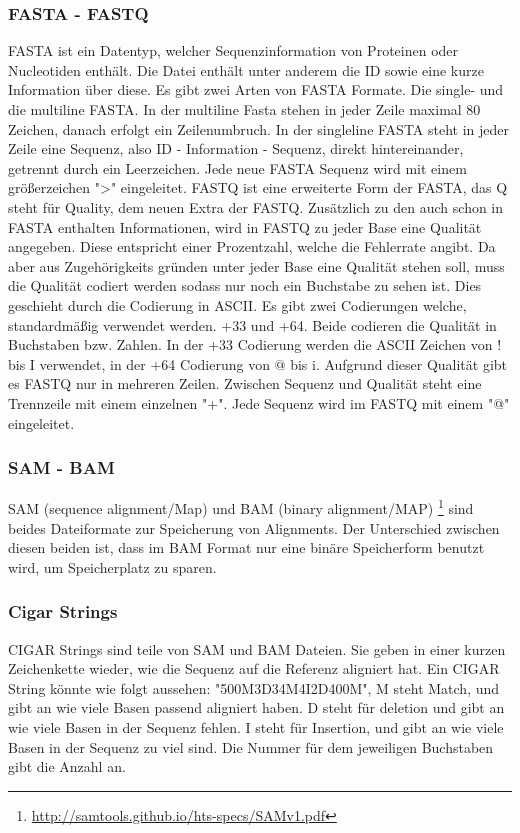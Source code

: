 \documentclass{scrartcl}
\begin{document}
\subsubsection{FASTA - FASTQ}
\label{sec-4-1-1}
FASTA ist ein Datentyp, welcher Sequenzinformation von Proteinen oder Nucleotiden enthält. Die Datei enthält unter anderem
die ID sowie eine kurze Information über diese. Es gibt zwei Arten von FASTA Formate. Die single- und die multiline FASTA.
In der multiline Fasta stehen in jeder Zeile maximal 80 Zeichen, danach erfolgt ein Zeilenumbruch. In der singleline FASTA
steht in jeder Zeile eine Sequenz, also ID - Information - Sequenz, direkt hintereinander, getrennt durch ein Leerzeichen.
Jede neue FASTA Sequenz wird mit einem größerzeichen ">" eingeleitet. 
FASTQ ist eine erweiterte Form der FASTA, das Q steht für Quality, dem neuen Extra der FASTQ. Zusätzlich zu den auch schon in FASTA
enthalten Informationen, wird in FASTQ zu jeder Base eine Qualität angegeben. Diese entspricht einer Prozentzahl, welche die Fehlerrate angibt.
Da aber aus Zugehörigkeits gründen unter jeder Base eine Qualität stehen soll, muss die Qualität codiert werden sodass nur noch ein Buchstabe zu sehen ist.
Dies geschieht durch die Codierung in ASCII. Es gibt zwei Codierungen welche, standardmäßig verwendet werden. +33 und +64. Beide codieren die Qualität in Buchstaben bzw. 
Zahlen. In der +33 Codierung werden die ASCII Zeichen von ! bis I verwendet, in der +64 Codierung von @ bis i. Aufgrund dieser Qualität gibt es FASTQ nur in mehreren Zeilen.
Zwischen Sequenz und Qualität steht eine Trennzeile mit einem einzelnen "+". Jede Sequenz wird im FASTQ mit einem "@" eingeleitet. 

\subsubsection{SAM - BAM}
\label{sec-4-1-2}
SAM (sequence alignment/Map) und BAM (binary alignment/MAP) \footnote{\url{http://samtools.github.io/hts-specs/SAMv1.pdf}} sind beides Dateiformate zur Speicherung von Alignments. Der Unterschied
zwischen diesen beiden ist, dass im BAM Format nur eine binäre Speicherform benutzt wird, um Speicherplatz zu sparen.

\subsubsection{Cigar Strings}
\label{sec-4-1-3}
CIGAR Strings sind teile von SAM und BAM Dateien. Sie geben in einer kurzen Zeichenkette wieder, wie die Sequenz auf die Referenz aligniert hat.
Ein CIGAR String könnte wie folgt aussehen: "500M3D34M4I2D400M", M steht Match, und gibt an wie viele Basen passend aligniert haben. D steht für
deletion und gibt an wie viele Basen in der Sequenz fehlen. I steht für Insertion, und gibt an wie viele Basen in der Sequenz zu viel sind. 
Die Nummer für dem jeweiligen Buchstaben gibt die Anzahl an.
\end{document}

